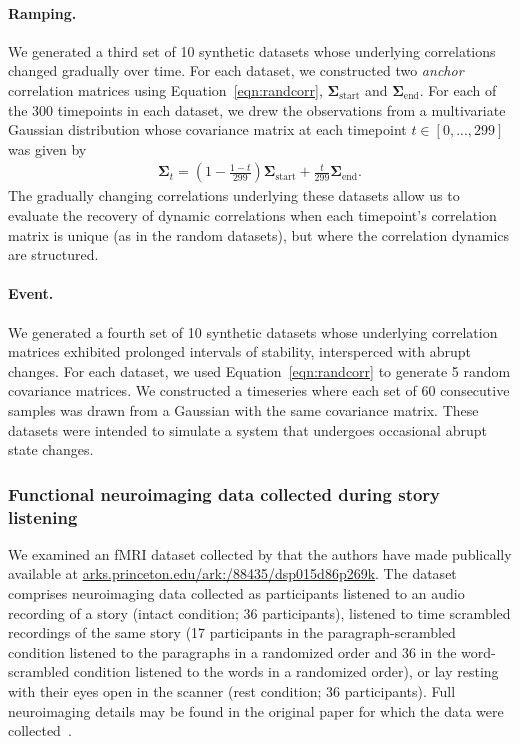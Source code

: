 \documentclass[english]{article}
\begin{document}
  \paragraph*{Ramping.}  We generated a third set of 10 synthetic
  datasets whose underlying correlations changed gradually over time.
  For each dataset, we constructed two \textit{anchor} correlation
  matrices using Equation~\ref{eqn:randcorr},
  $\mathbf{\Sigma}_{\mathrm{start}}$ and
  $\mathbf{\Sigma}_{\mathrm{end}}$.  For each of the 300 timepoints in
  each dataset, we drew the observations from a multivariate Gaussian
  distribution whose covariance matrix at each timepoint $t \in
  \left[0, ..., 299\right]$ was given by
  \begin{align}
    \mathbf{\Sigma}_t = \left( 1 - \frac{1 - t}{299} \right)
    \mathbf{\Sigma}_{\mathrm{start}} + \frac{t}{299}\mathbf{\Sigma}_{\mathrm{end}}.
  \end{align}
The gradually changing correlations underlying these datasets allow us
to evaluate the recovery of dynamic correlations when each timepoint's
correlation matrix is unique (as in the random datasets), but where
the correlation dynamics are structured.
  
\paragraph*{Event.} We generated a fourth set of 10 synthetic datasets
whose underlying correlation matrices exhibited prolonged intervals of
stability, intersperced with abrupt changes.  For each dataset, we
used Equation~\ref{eqn:randcorr} to generate 5 random covariance
matrices.  We constructed a timeseries where each set of 60 consecutive samples
was drawn from a Gaussian with the same covariance matrix.  These
datasets were intended to simulate a system that undergoes occasional
abrupt state changes.

\subsubsection*{Functional neuroimaging data collected during story
  listening}
We examined an fMRI dataset collected by \cite{SimoEtal16} that the
authors have made publically available at
\href{http://arks.princeton.edu/ark:/88435/dsp015d86p269k}{arks.princeton.edu/ark:/88435/dsp015d86p269k}.  The dataset
comprises neuroimaging data collected as participants listened
to an audio recording of a story (intact condition; 36 participants),
listened to time scrambled recordings of the same story (17
participants in the paragraph-scrambled condition listened to the
paragraphs in a randomized order and 36 in the word-scrambled
condition listened to the words in a randomized order), or lay resting
with their eyes open in the scanner (rest condition; 36
participants).  Full neuroimaging details may be found in the original
paper for which the data were collected~\citep{SimoEtal16}.
\end{document}
